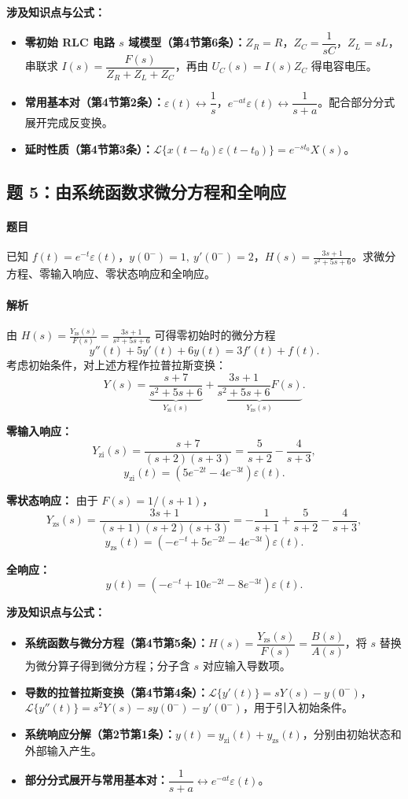 \documentclass[12pt,a4paper]{ctexart}
\newcommand{\eps}{\varepsilon}
\begin{document}
\textbf{涉及知识点与公式：}
\begin{itemize}
    \item \textbf{零初始 RLC 电路 $s$ 域模型（第4节第6条）：}$Z_R=R$，$Z_C=\dfrac1{sC}$，$Z_L=sL$，串联求 $I(s)=\dfrac{F(s)}{Z_R+Z_L+Z_C}$，再由 $U_C(s)=I(s)Z_C$ 得电容电压。
    \item \textbf{常用基本对（第4节第2条）：}$\eps(t)\longleftrightarrow\dfrac1s$，$e^{-at}\eps(t)\longleftrightarrow\dfrac1{s+a}$。配合部分分式展开完成反变换。
    \item \textbf{延时性质（第4节第3条）：}$\mathcal L\{x(t-t_0)\eps(t-t_0)\}=e^{-st_0}X(s)$。
\end{itemize}

\subsection{题 5：由系统函数求微分方程和全响应}
\paragraph{题目}
已知 \(\displaystyle f(t)=e^{-t}\eps(t)\)，\(\displaystyle y(0^-)=1,\ y'(0^-)=2\)，\(\displaystyle H(s)=\frac{3s+1}{s^2+5s+6}\)。求微分方程、零输入响应、零状态响应和全响应。

\paragraph{解析}
由 \(\displaystyle H(s)=\frac{Y_{\mathrm{zs}}(s)}{F(s)}=\frac{3s+1}{s^2+5s+6}\) 可得零初始时的微分方程
\[
\boxed{y''(t)+5y'(t)+6y(t)=3f'(t)+f(t).}
\]
考虑初始条件，对上述方程作拉普拉斯变换：
\[
Y(s)=\underbrace{\frac{s+7}{s^2+5s+6}}_{Y_{\mathrm{zi}}(s)}
+\underbrace{\frac{3s+1}{s^2+5s+6}F(s)}_{Y_{\mathrm{zs}}(s)}.
\]

\textbf{零输入响应：}
\[
Y_{\mathrm{zi}}(s)
=\frac{s+7}{(s+2)(s+3)}
=\frac5{s+2}-\frac4{s+3},
\]
\[
\boxed{
y_{\mathrm{zi}}(t)=\left(5e^{-2t}-4e^{-3t}\right)\eps(t).}
\]

\textbf{零状态响应：} 由于 $F(s)=1/(s+1)$，
\[
Y_{\mathrm{zs}}(s)
=\frac{3s+1}{(s+1)(s+2)(s+3)}
=-\frac1{s+1}+\frac5{s+2}-\frac4{s+3},
\]
\[
\boxed{
y_{\mathrm{zs}}(t)=\left(-e^{-t}+5e^{-2t}-4e^{-3t}\right)\eps(t).}
\]

\textbf{全响应：}
\[
\boxed{
y(t)=\left(-e^{-t}+10e^{-2t}-8e^{-3t}\right)\eps(t).}
\]

\textbf{涉及知识点与公式：}
\begin{itemize}
    \item \textbf{系统函数与微分方程（第4节第5条）：}$H(s)=\dfrac{Y_{\mathrm{zs}}(s)}{F(s)}=\dfrac{B(s)}{A(s)}$，将 $s$ 替换为微分算子得到微分方程；分子含 $s$ 对应输入导数项。
    \item \textbf{导数的拉普拉斯变换（第4节第4条）：}$\mathcal L\{y'(t)\}=sY(s)-y(0^-)$，$\mathcal L\{y''(t)\}=s^2Y(s)-sy(0^-)-y'(0^-)$，用于引入初始条件。
    \item \textbf{系统响应分解（第2节第1条）：}$y(t)=y_{\mathrm{zi}}(t)+y_{\mathrm{zs}}(t)$，分别由初始状态和外部输入产生。
    \item \textbf{部分分式展开与常用基本对：}$\dfrac1{s+a}\longleftrightarrow e^{-at}\eps(t)$。
\end{itemize}
\end{document}
